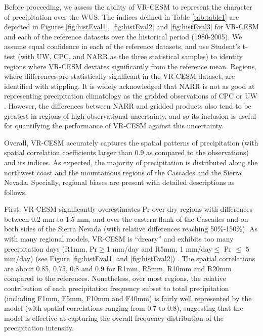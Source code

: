 \documentclass{ametsoc}
\begin{document}
Before proceeding, we assess the ability of VR-CESM to represent the character of precipitation over the WUS.  The indices defined in Table \ref{tab:table1} are depicted in Figures \ref{fig:histEval1}, \ref{fig:histEval2} and \ref{fig:histEval3} for VR-CESM and each of the reference datasets over the historical period (1980-2005).  We assume equal confidence in each of the reference datasets, and use Student's t-test (with UW, CPC, and NARR as the three statistical samples) to identify regions where VR-CESM deviates significantly from the reference mean. Regions, where differences are statistically significant in the VR-CESM dataset, are identified with stippling. It is widely acknowledged that NARR is not as good at representing precipitation climatology as the gridded observations of CPC or UW \citep{bukovsky2007brief, huang2016evaluation}. However, the differences between NARR and gridded products also tend to be greatest in regions of high observational uncertainty, and so its inclusion is useful for quantifying the performance of VR-CESM against this uncertainty.


Overall, VR-CESM accurately captures the spatial patterns of precipitation (with spatial correlation coefficients larger than 0.9 as compared to the observations) and its indices. As expected, the majority of precipitation is distributed along the northwest coast and the mountainous regions of the Cascades and the Sierra Nevada. Specially, regional biases are present with detailed descriptions as follows.

First, VR-CESM significantly overestimates Pr over dry regions with differences between 0.2 mm to 1.5 mm, and over the eastern flank of the Cascades and on both sides of the Sierra Nevada (with relative differences reaching 50$\%$-150$\%$).  As with many regional models, VR-CESM is ``dreary'' and exhibits too many precipitation days (R1mm, Pr$\geq$1 mm/day and R5mm, 1 mm/day$\leq$ Pr $\leq$ 5 mm/day) (see Figure \ref{fig:histEval1} and \ref{fig:histEval2}) \citep{stephens2010dreary}. The spatial correlations are about 0.85, 0.75, 0.8 and 0.9 for R1mm, R5mm, R10mm and R20mm compared to the references. Nonetheless, over most regions, the relative contribution of each precipitation frequency subset to total precipitation (including F1mm, F5mm, F10mm and F40mm) is fairly well represented by the model (with spatial correlations ranging from 0.7 to 0.8), suggesting that the model is effective at capturing the overall frequency distribution of the precipitation intensity.
\end{document}
